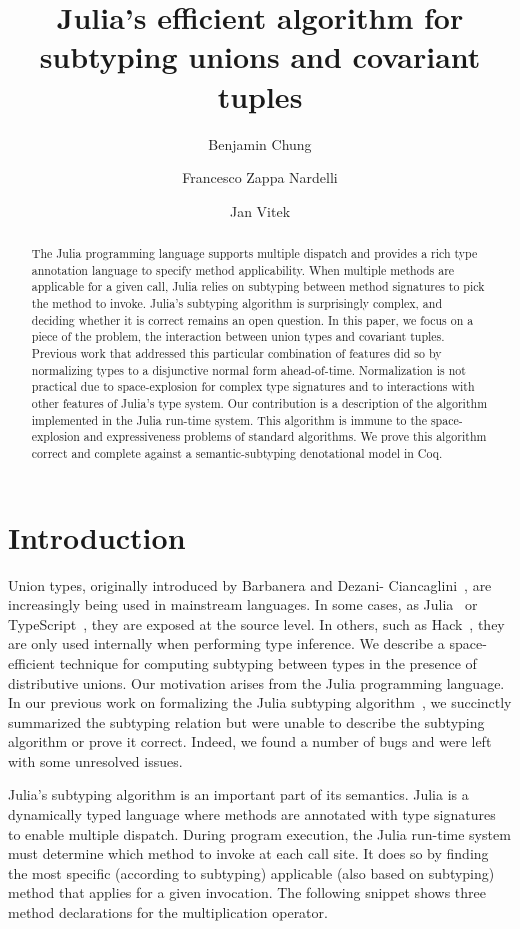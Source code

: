\documentclass[a4paper,english]{lipics-v2019}
\title{Julia's efficient algorithm for subtyping unions and covariant tuples}
\author{Benjamin Chung}{Northeastern University}{}{}{}%
\author{Francesco Zappa Nardelli}{INRIA}{}{}{}
\author{Jan Vitek}{Northeastern University \& Czech Technical University}{}{}{}
\begin{document}
\maketitle
\begin{abstract}
  The Julia programming language supports multiple dispatch and provides a
  rich type annotation language to specify method applicability. When
  multiple methods are applicable for a given call, Julia relies on
  subtyping between method signatures to pick the method to invoke. Julia's
  subtyping algorithm is surprisingly complex, and deciding whether it is
  correct remains an open question. In this paper, we focus on a piece of
  the problem, the interaction between union types and covariant
  tuples. Previous work that addressed this particular combination of
  features did so by normalizing types to a disjunctive normal form
  ahead-of-time. Normalization is not practical due to space-explosion for
  complex type signatures and to interactions with other features of Julia's
  type system.  Our contribution is a description of the algorithm
  implemented in the Julia run-time system. This algorithm is immune to the
  space-explosion and expressiveness problems of standard algorithms.  We
  prove this algorithm correct and complete against a semantic-subtyping
  denotational model in Coq.
\end{abstract}

\section{Introduction}

Union types, originally introduced by Barbanera and Dezani-
Ciancaglini~\cite{barbanera1991intersection}, are increasingly being used in
mainstream languages. In some cases, as Julia~\cite{BezansonEKS17} or
TypeScript~\cite{typescript}, they are exposed at the source level. In
others, such as Hack~\cite{hack}, they are only used internally when
performing type inference. We describe a space-efficient technique for
computing subtyping between types in the presence of distributive unions.
Our motivation arises from the Julia programming language. In our previous
work on formalizing the Julia subtyping algorithm~\cite{DBLP:NardelliBPCBV18},
we succinctly summarized the subtyping relation but were unable to describe
the subtyping algorithm or prove it correct. Indeed, we found a number of bugs
and were left with some unresolved issues.

Julia's subtyping algorithm is an important part of its semantics. Julia is a
dynamically typed language where methods are annotated with type signatures to
enable multiple dispatch. During program execution, the Julia run-time system
must determine which method to invoke at each call site. It does so by finding
the most specific (according to subtyping) applicable (also based on
subtyping) method that applies for a given invocation. The following snippet
shows three method declarations for the multiplication operator.
\end{document}
